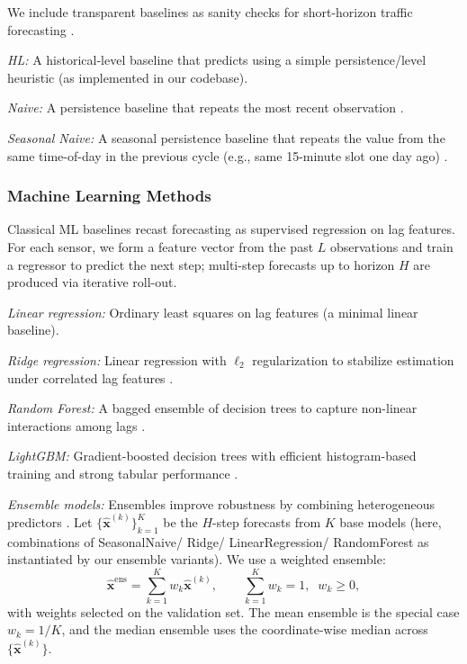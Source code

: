 \documentclass[10pt]{article}
\begin{document}
We include transparent baselines as sanity checks for short-horizon traffic forecasting \citep{hyndman2021fpp}.

\textit{HL:}
A historical-level baseline that predicts using a simple persistence/level heuristic (as implemented in our codebase).

\textit{Naive:}
A persistence baseline that repeats the most recent observation \citep{hyndman2021fpp}.

\textit{Seasonal Naive:}
A seasonal persistence baseline that repeats the value from the same time-of-day in the previous cycle
(e.g., same 15-minute slot one day ago) \citep{hyndman2021fpp}.

\subsubsection{Machine Learning Methods}
Classical ML baselines recast forecasting as supervised regression on lag features. For each sensor,
we form a feature vector from the past $L$ observations and train a regressor to predict the next step;
multi-step forecasts up to horizon $H$ are produced via iterative roll-out.

\textit{Linear regression:}
Ordinary least squares on lag features (a minimal linear baseline).

\textit{Ridge regression:}
Linear regression with $\ell_2$ regularization to stabilize estimation under correlated lag features \citep{hoerl1970ridge}.

\textit{Random Forest:}
A bagged ensemble of decision trees to capture non-linear interactions among lags \citep{breiman2001randomforest}.

\textit{LightGBM:}
Gradient-boosted decision trees with efficient histogram-based training and strong tabular performance \citep{ke2017lightgbm}.

\textit{Ensemble models:}
Ensembles improve robustness by combining heterogeneous predictors \citep{bates1969combination}.
Let $\{\hat{\mathbf{x}}^{(k)}\}_{k=1}^K$ be the $H$-step forecasts from $K$ base models (here, combinations of
SeasonalNaive/ Ridge/ LinearRegression/ RandomForest as instantiated by our ensemble variants). We use a weighted ensemble:
\begin{equation}
\hat{\mathbf{x}}^{\text{ens}}=\sum_{k=1}^K w_k \hat{\mathbf{x}}^{(k)}, \qquad
\sum_{k=1}^K w_k=1,\;\; w_k\ge 0,
\end{equation}
with weights selected on the validation set. The mean ensemble is the special case $w_k = 1/K$,
and the median ensemble uses the coordinate-wise median across $\{\hat{\mathbf{x}}^{(k)}\}$.
\end{document}
